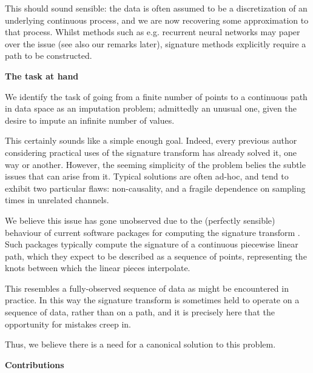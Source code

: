 \documentclass{article}
\renewcommand{\subsubsection}[1]{\textbf{#1}

} %
\begin{document}
This should sound sensible: the data is often assumed to be a discretization of an underlying continuous process, and we are now recovering some approximation to that process. Whilst methods such as e.g. recurrent neural networks may paper over the issue (see also our remarks later), signature methods explicitly require a path to be constructed.

\subsubsection{The task at hand}

We identify the task of going from a finite number of points to a continuous path in data space as an imputation problem; admittedly an unusual one, given the desire to impute an infinite number of values.

This certainly sounds like a simple enough goal. Indeed, every previous author considering practical uses of the signature transform has already solved it, one way or another. However, the seeming simplicity of the problem belies the subtle issues that can arise from it. Typical solutions are often ad-hoc, and tend to exhibit two particular flaws: non-causality, and a fragile dependence on sampling times in unrelated channels.

We believe this issue has gone unobserved due to the (perfectly sensible) behaviour of current software packages for computing the signature transform \citep{esig, iisignature, signatory}. Such packages typically compute the signature of a continuous piecewise linear path, which they expect to be described as a sequence of points, representing the knots between which the linear pieces interpolate.

This resembles a fully-observed sequence of data as might be encountered in practice. In this way the signature transform is sometimes held to operate on a sequence of data, rather than on a path, and it is precisely here that the opportunity for mistakes creep in.%

Thus, we believe there is a need for a canonical solution to this problem.

\subsubsection{Contributions}
\end{document}
